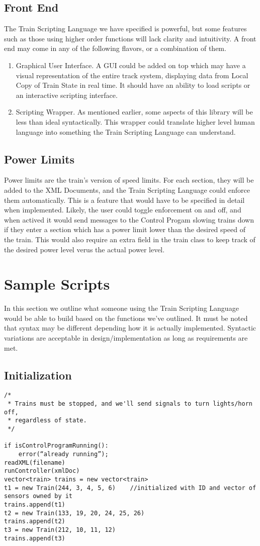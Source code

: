 \documentclass[a4paper,11pt,notitlepage]{article}
\def\TSL{Train Scripting Language\xspace}
\def\CS{Control Progam\xspace}
\def\LC{Local Copy of Train State\xspace}
\begin{document}
\subsection{Front End}
The \TSL we have specified is powerful, but some features such as those using higher order functions will lack clarity and intuitivity. A front end may come in any of the following flavors, or a combination of them.
\begin{enumerate}
    \item Graphical User Interface. A GUI could be added on top which may have a visual representation of the entire track system, displaying data from \LC in real time. It should have an ability to load scripts or an interactive scripting interface.
    \item Scripting Wrapper. As mentioned earlier, some aspects of this library will be less than ideal syntactically. This wrapper could translate higher level human language into something the \TSL can understand.
\end{enumerate}
\subsection{Power Limits}
Power limits are the train's version of speed limits. For each section, they will be added to the XML Documents, and the \TSL could enforce them automatically. This is a feature that would have to be specified in detail when implemented. Likely, the user could toggle enforcement on and off, and when actived it would send messages to the \CS slowing trains down if they enter a section which has a power limit lower than the desired speed of the train. This would also require an extra field in the train class to keep track of the desired power level verus the actual power level.

\newpage
\section{Sample Scripts}
In this section we outline what someone using the \TSL would be able to build based on the functions we've outlined. It must be noted that syntax may be different depending how it is actually implemented. Syntactic variations are acceptable in design/implementation as long as requirements are met.

\subsection{Initialization}
\begin{verbatim}
/*
 * Trains must be stopped, and we'll send signals to turn lights/horn off,
 * regardless of state.
 */

if isControlProgramRunning():
    error(“already running”);
readXML(filename)
runController(xmlDoc)
vector<train> trains = new vector<train>
t1 = new Train(244, 3, 4, 5, 6)    //initialized with ID and vector of sensors owned by it
trains.append(t1)
t2 = new Train(133, 19, 20, 24, 25, 26)
trains.append(t2)
t3 = new Train(212, 10, 11, 12)
trains.append(t3)
\end{verbatim}
\end{document}
